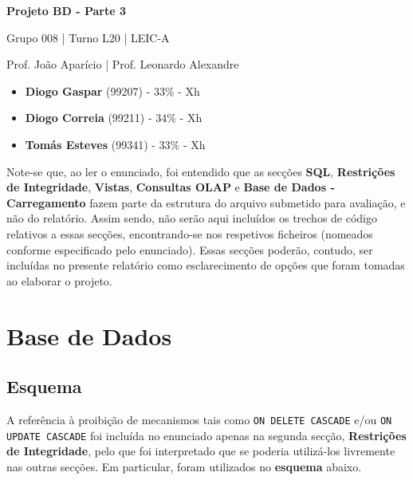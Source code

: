 \documentclass[12pt,a4paper]{article}
\begin{document}
  \begin{titlepage}
    \begin{center}
      \vspace*{5cm}

      \Huge
      \textbf{Projeto BD - Parte 3}

      \vspace{0.5cm}
      \LARGE
      Grupo 008 | Turno L20 | LEIC-A

      \vspace{0.5cm}
      \large
      Prof. João Aparício | Prof. Leonardo Alexandre

      \vfill
    \end{center}
    \large
    \begin{itemize}
      \item[] \textbf{Diogo Gaspar} (99207) - 33\% - Xh
      \item[] \textbf{Diogo Correia} (99211) - 34\% - Xh
      \item[] \textbf{Tomás Esteves} (99341) - 33\% - Xh
    \end{itemize}
  \end{titlepage}

  Note-se que, ao ler o enunciado, foi entendido que as secções \textbf{SQL},
  \textbf{Restrições de Integridade}, \textbf{Vistas}, \textbf{Consultas OLAP}
  e \textbf{Base de Dados - Carregamento} fazem parte da estrutura do arquivo
  submetido para avaliação, e não do relatório. Assim sendo, não serão aqui
  incluídos os trechos de código relativos a essas secções, encontrando-se nos
  respetivos ficheiros (nomeados conforme especificado pelo enunciado). Essas
  secções poderão, contudo, ser incluídas no presente relatório como esclarecimento
  de opções que foram tomadas ao elaborar o projeto.

  \section*{Base de Dados}

  \subsection*{Esquema}

  A referência à proibição de mecanismos tais como \texttt{ON DELETE CASCADE} e/ou
  \texttt{ON UPDATE CASCADE} foi incluída no enunciado apenas na segunda secção,
  \textbf{Restrições de Integridade}, pelo que foi interpretado que se poderia
  utilizá-los livremente nas outras secções. Em particular, foram utilizados no
  \textbf{esquema} abaixo.
\end{document}
